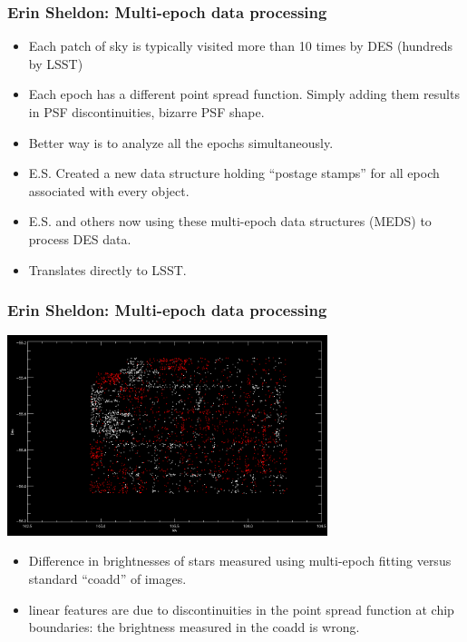 \documentclass{beamer}
\begin{document}
\frame
{
    \frametitle{Erin Sheldon: Multi-epoch data processing}

    \begin{itemize}
        \item Each patch of sky is typically visited more than 10 times
            by DES (hundreds by LSST)
        \item Each epoch has a different point spread function.   Simply adding
            them results in PSF discontinuities, bizarre PSF shape. 
        \item Better way is to analyze all the epochs simultaneously.
        \item E.S. Created a new data structure holding ``postage stamps''
            for all epoch associated with every object.
        \item E.S. and others now using these multi-epoch data structures (MEDS) to 
            process DES data.
        \item Translates directly to LSST.
    \end{itemize}
}

\frame
{
    \frametitle{Erin Sheldon: Multi-epoch data processing}

    \begin{center}
        \includegraphics[width=0.7\textwidth]{delta_psf_pos.png}
    \end{center}
    \fontsize{9}{0.8\baselineskip}
    \begin{itemize}
        \item Difference in brightnesses of stars measured using
            multi-epoch fitting versus standard ``coadd'' of images.
        \item linear features are due to discontinuities in the
            point spread function at chip boundaries: the 
            brightness measured in the coadd is wrong.
    \end{itemize}
}
\end{document}
